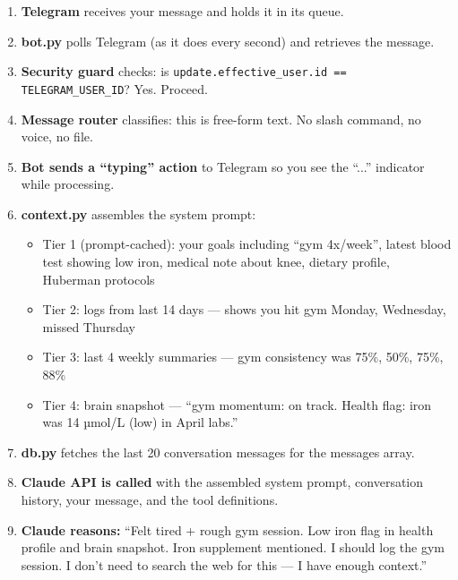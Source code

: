 \documentclass[12pt, a4paper]{article}
\begin{document}
\begin{enumerate}
    \item \textbf{Telegram} receives your message and holds it in its queue.

    \item \textbf{bot.py} polls Telegram (as it does every second) and retrieves the message.

    \item \textbf{Security guard} checks: is \texttt{update.effective\_user.id == TELEGRAM\_USER\_ID}? Yes. Proceed.

    \item \textbf{Message router} classifies: this is free-form text. No slash command, no voice, no file.

    \item \textbf{Bot sends a ``typing'' action} to Telegram so you see the ``...'' indicator while processing.

    \item \textbf{context.py} assembles the system prompt:
    \begin{itemize}[noitemsep]
        \item Tier 1 (prompt-cached): your goals including ``gym 4x/week'', latest blood test showing low iron, medical note about knee, dietary profile, Huberman protocols
        \item Tier 2: logs from last 14 days --- shows you hit gym Monday, Wednesday, missed Thursday
        \item Tier 3: last 4 weekly summaries --- gym consistency was 75\%, 50\%, 75\%, 88\%
        \item Tier 4: brain snapshot --- ``gym momentum: on track. Health flag: iron was 14 µmol/L (low) in April labs.''
    \end{itemize}

    \item \textbf{db.py} fetches the last 20 conversation messages for the messages array.

    \item \textbf{Claude API is called} with the assembled system prompt, conversation history, your message, and the tool definitions.

    \item \textbf{Claude reasons:} ``Felt tired + rough gym session. Low iron flag in health profile and brain snapshot. Iron supplement mentioned. I should log the gym session. I don't need to search the web for this --- I have enough context.''


\end{enumerate}
\end{document}
